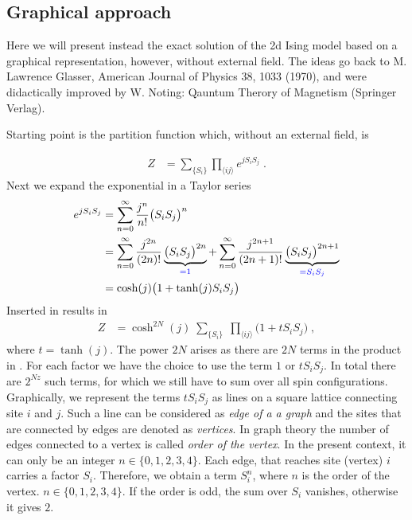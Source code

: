 \subsection{Graphical approach }
Here we will present instead the exact solution of the 2d Ising model based on a graphical representation, however, without external field.
The  ideas go back to M. Lawrence Glasser, American Journal of Physics 38, 1033 (1970), and were
didactically improved by W. Noting: Qauntum Therory of Magnetism (Springer Verlag).

Starting point is the partition function which, without an external field, is
%

\begin{align}\label{eq:Ising:2d:Z}
Z &= \sum_{\{S_{i}\}} \prod_{\langle ij \rangle} e^{j S_{i}S_{j}}\;.
\end{align}
%
Next we expand the exponential in a Taylor series
%
\begin{align*}
 e^{j S_{i}S_{j}} 
&= \sum_{n=0}^{\infty}\frac{j^{n}}{n!} \big( S_{i}S_{j} \big)^{n}\\
&= \sum_{n=0}^{\infty}\frac{j^{2n}}{(2n)!} \underbrace{
\big( S_{i}S_{j} \big)^{2n}
}_{\color{blue} = 1}
+\sum_{n=0}^{\infty}\frac{j^{2n+1}}{(2n+1)!} \underbrace{
\big( S_{i}S_{j} \big)^{2n+1}
}_{\color{blue} = S_{i}S_{j}}\\
&= \cosh(j)\big(1 + \tanh(j) S_{i}S_{j}\big)
\end{align*}
%
Inserted in  results in
%
\begin{align*}
Z&= \cosh^{2N}(j) \;\sum_{\{S_{i}\}}\;\prod_{\langle ij \rangle} \big( 1+ t S_{i} S_{j}\big)\;,
\end{align*}
%
where  $t=\tanh(j)$. The power $2N$ arises as there are $2N$ terms in the product in . For each factor we have the choice to use
the term $1$ or $t S_{i}S_{j}$. In total there are $2^{Nz}$ such terms, for which we still have to sum over all spin configurations. Graphically, we represent the terms $t S_{i}S_{j}$ as lines 
on a square lattice connecting site $i$ and $j$. Such a line can be considered as {\em edge of a a graph} and the sites that are connected by edges are 
denoted as  {\em vertices}. In graph theory the number of edges connected to a vertex is called {\em order of the vertex}. In the present context, it can only be
an integer $n\in\{0,1,2,3,4\}$.
Each edge, that reaches site (vertex)  $i$  carries a factor $S_{i}$. Therefore, we obtain a term $S_{i}^{n}$, where $n$ is the order of the vertex. $n\in\{0,1,2,3,4\}$. If the order is odd, the sum over $S_{i}$ vanishes, otherwise it gives $2$. 
